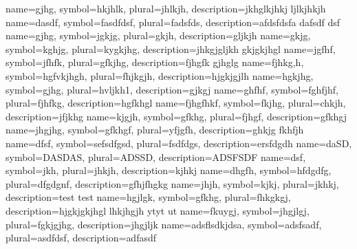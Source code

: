 
{
	name={gjhg},
	symbol={hkjhlk},
	plural={jhlkjh},
	description={jkhglkjhkj ljlkjhkjh }
}
{
	name={dasdf},
	symbol={fasdfdsf},
	plural={fadsfds},
	description={afdsfdsfa dafsdf dsf}
}
{
	name={gjhg},
	symbol={jgkjg},
	plural={gkjh},
	description={gljkjh}
}
{
	name={gkjg},
	symbol={kghjg},
	plural={kygkjhg},
	description={jhkgjgljkh  gkjgkjhgl}
}
{
	name={jgfhf},
	symbol={jfhfk},
	plural={gfkjhg},
	description={fjhgfk  gjhglg}
}
{
	name={fjhkg,h},
	symbol={hgfvkjhgh},
	plural={fhjkgjh},
	description={hjgkjgjlh}
}
{
	name={hgkjhg},
	symbol={gjhg},
	plural={hvljkh1},
	description={gjkgj	}
}
{
	name={ghfhf},
	symbol={fghfjhf},
	plural={fjhfkg},
	description={hgfkhgl}
}
{
	name={fjhgfhkf},
	symbol={fkjhg},
	plural={chkjh},
	description={jfjkhg}
}
{
	name={kjgjh},
	symbol={gfkhg},
	plural={fjhgf},
	description={gfkhgj}
}
{
	name={jhgjhg},
	symbol={gfkhgf},
	plural={yfjgfh},
	description={ghkjg	fkhfjh}
}
{
	name={dfsf},
	symbol={sefsdfgsd},
	plural={fsdfdgs},
	description={ersfdgdh}
}
{
	name={daSD},
	symbol={DASDAS},
	plural={ADSSD},
	description={ADSFSDF}
}
{
	name={dsf},
	symbol={jkh},
	plural={jhkjh},
	description={kjhkj	}
}
{
	name={dhgfh},
	symbol={hfdgdfg},
	plural={dfgdgnf},
	description={gfhjfhgkg}
}
{
	name={jhjh},
	symbol={kjkj},
	plural={jkhkj},
	description={test test}
}
{
	name={hgjlgk},
	symbol={gfkhg},
	plural={fhkgkgj},
	description={hjgkjgkjhgl
lhkjhgjh
ytyt 
ut}
}
{
	name={fkuygj},
	symbol={jhgjlgj},
	plural={fgkjgjhg},
	description={jhgjljk	}
}
{
	name={adsflsdkjdsa},
	symbol={adsfsadf},
	plural={asdfdsf},
	description={adfasdf}
}